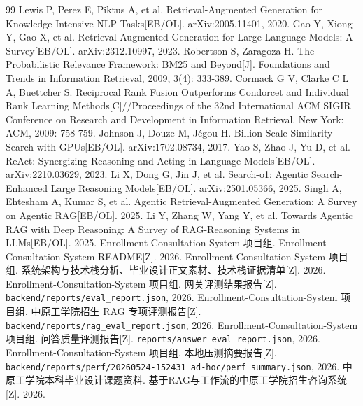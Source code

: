 \documentclass[UTF8,zihao=-4,oneside]{ctexbook}
\numberwithin{equation}{chapter}
\begin{document}
\clearpage
{\fontsize{12pt}{21pt}\selectfont
\begin{thebibliography}{99}
 Lewis P, Perez E, Piktus A, et al. Retrieval-Augmented Generation for Knowledge-Intensive NLP Tasks[EB/OL]. arXiv:2005.11401, 2020.
 Gao Y, Xiong Y, Gao X, et al. Retrieval-Augmented Generation for Large Language Models: A Survey[EB/OL]. arXiv:2312.10997, 2023.
 Robertson S, Zaragoza H. The Probabilistic Relevance Framework: BM25 and Beyond[J]. Foundations and Trends in Information Retrieval, 2009, 3(4): 333-389.
 Cormack G V, Clarke C L A, Buettcher S. Reciprocal Rank Fusion Outperforms Condorcet and Individual Rank Learning Methods[C]//Proceedings of the 32nd International ACM SIGIR Conference on Research and Development in Information Retrieval. New York: ACM, 2009: 758-759.
 Johnson J, Douze M, J{\'e}gou H. Billion-Scale Similarity Search with GPUs[EB/OL]. arXiv:1702.08734, 2017.
 Yao S, Zhao J, Yu D, et al. ReAct: Synergizing Reasoning and Acting in Language Models[EB/OL]. arXiv:2210.03629, 2023.
 Li X, Dong G, Jin J, et al. Search-o1: Agentic Search-Enhanced Large Reasoning Models[EB/OL]. arXiv:2501.05366, 2025.
 Singh A, Ehtesham A, Kumar S, et al. Agentic Retrieval-Augmented Generation: A Survey on Agentic RAG[EB/OL]. 2025.
 Li Y, Zhang W, Yang Y, et al. Towards Agentic RAG with Deep Reasoning: A Survey of RAG-Reasoning Systems in LLMs[EB/OL]. 2025.
 Enrollment-Consultation-System 项目组. Enrollment-Consultation-System README[Z]. 2026.
 Enrollment-Consultation-System 项目组. 系统架构与技术栈分析、毕业设计正文素材、技术栈证据清单[Z]. 2026.
 Enrollment-Consultation-System 项目组. 网关评测结果报告[Z]. \texttt{backend/reports/eval\_report.json}, 2026.
 Enrollment-Consultation-System 项目组. 中原工学院招生 RAG 专项评测报告[Z]. \texttt{backend/reports/rag\_eval\_report.json}, 2026.
 Enrollment-Consultation-System 项目组. 问答质量评测报告[Z]. \texttt{reports/answer\_eval\_report.json}, 2026.
   Enrollment-Consultation-System 项目组. 本地压测摘要报告[Z]. \texttt{backend/reports/perf/20260524-152431\_ad-hoc/perf\_summary.json}, 2026.
 中原工学院本科毕业设计课题资料. 基于RAG与工作流的中原工学院招生咨询系统[Z]. 2026.
\end{thebibliography}
}
\end{document}
